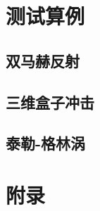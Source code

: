\documentclass[UTF8,zihao=5]{ctexart} %
\begin{document}
\section{测试算例}

\subsection{双马赫反射}

\subsection{三维盒子冲击}

\subsection{泰勒-格林涡}

\section*{附录}

% 



























\end{document}
